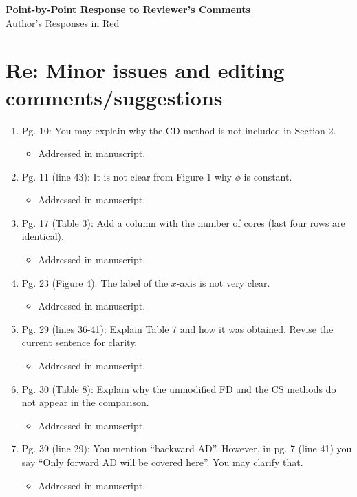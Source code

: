 \documentclass{article}
\begin{document}
\begin{center}
    {\LARGE \bf Point-by-Point Response to Reviewer's Comments} \\
     Author's Responses in {\color{red} Red}
\end{center}

\section*{Re: Minor issues and editing comments/suggestions}
%
\begin{enumerate}
	\item[] Pg. 10: You may explain why the CD method is not included in Section 2. 
{\color{red}
  \begin{itemize}
		\item Addressed in manuscript.
		\end{itemize}
}
	\item[] Pg. 11 (line 43): It is not clear from Figure 1 why $\phi$ is constant.
{\color{red}
  \begin{itemize}
		\item Addressed in manuscript.
		\end{itemize}
}
	\item[] Pg. 17 (Table 3): Add a column with the number of cores (last four rows are identical).
{\color{red}
  \begin{itemize}
		\item Addressed in manuscript.
		\end{itemize}
}
	\item[] Pg. 23 (Figure 4): The label of the $x$-axis is not very clear.
{\color{red}
  \begin{itemize}
		\item Addressed in manuscript.
		\end{itemize}
}
	\item[] Pg. 29 (lines 36-41): Explain Table 7 and how it was obtained. Revise the current sentence for clarity. 
{\color{red}
  \begin{itemize}
		\item Addressed in manuscript.
		\end{itemize}
}
	\item[] Pg. 30 (Table 8): Explain why the unmodified FD and the CS methods do not appear in the comparison. 
{\color{red}
  \begin{itemize}
		\item Addressed in manuscript.
		\end{itemize}
}
	\item[] Pg. 39 (line 29): You mention ``backward AD''. However, in pg. 7 (line 41) you say ``Only forward AD will be covered here''. You may clarify that. 
{\color{red}
  \begin{itemize}
		\item Addressed in manuscript.
		\end{itemize}
}
\end{enumerate}
\end{document}
